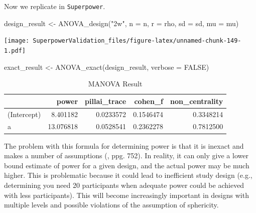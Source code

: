 \documentclass[
]{book}
\newenvironment{Shaded}{\begin{snugshade}}{\end{snugshade}}
\newcommand{\AttributeTok}[1]{\textcolor[rgb]{0.77,0.63,0.00}{#1}}
\newcommand{\ConstantTok}[1]{\textcolor[rgb]{0.00,0.00,0.00}{#1}}
\newcommand{\FunctionTok}[1]{\textcolor[rgb]{0.00,0.00,0.00}{#1}}
\newcommand{\NormalTok}[1]{#1}
\newcommand{\OtherTok}[1]{\textcolor[rgb]{0.56,0.35,0.01}{#1}}
\newcommand{\StringTok}[1]{\textcolor[rgb]{0.31,0.60,0.02}{#1}}
\begin{document}
\newpage

Now we replicate in \texttt{Superpower}.

\begin{Shaded}
\begin{Highlighting}[]
\NormalTok{design\_result }\OtherTok{\textless{}{-}} \FunctionTok{ANOVA\_design}\NormalTok{(}\StringTok{"2w"}\NormalTok{,}
                              \AttributeTok{n =}\NormalTok{ n,}
                              \AttributeTok{r =}\NormalTok{ rho,}
                              \AttributeTok{sd =}\NormalTok{ sd,}
                              \AttributeTok{mu =}\NormalTok{ mu)}
\end{Highlighting}
\end{Shaded}

\texttt{[image: SuperpowerValidation\_files/figure-latex/unnamed-chunk-149-1.pdf]}

\begin{Shaded}
\begin{Highlighting}[]
\NormalTok{exact\_result }\OtherTok{\textless{}{-}} \FunctionTok{ANOVA\_exact}\NormalTok{(design\_result, }\AttributeTok{verbose =} \ConstantTok{FALSE}\NormalTok{)}
\end{Highlighting}
\end{Shaded}

\begin{table}[!h]

\caption{\label{tab:unnamed-chunk-150}MANOVA Result}
\centering
\begin{tabular}[t]{l|r|r|r|r}
\hline
  & power & pillai\_trace & cohen\_f & non\_centrality\\
\hline
(Intercept) & 8.401182 & 0.0233572 & 0.1546474 & 0.3348214\\
\hline
a & 13.076818 & 0.0528541 & 0.2362278 & 0.7812500\\
\hline
\end{tabular}
\end{table}

The problem with this formula for determining power is that it is inexact and makes a number of assumptions (\citet{maxwell_designing_2004}, ppg. 752). In reality, it can only give a lower bound estimate of power for a given design, and the actual power may be much higher. This is problematic because it could lead to inefficient study design (e.g., determining you need 20 participants when adequate power could be achieved with less participants). This will become increasingly important in designs with multiple levels and possible violations of the assumption of sphericity.
\end{document}

